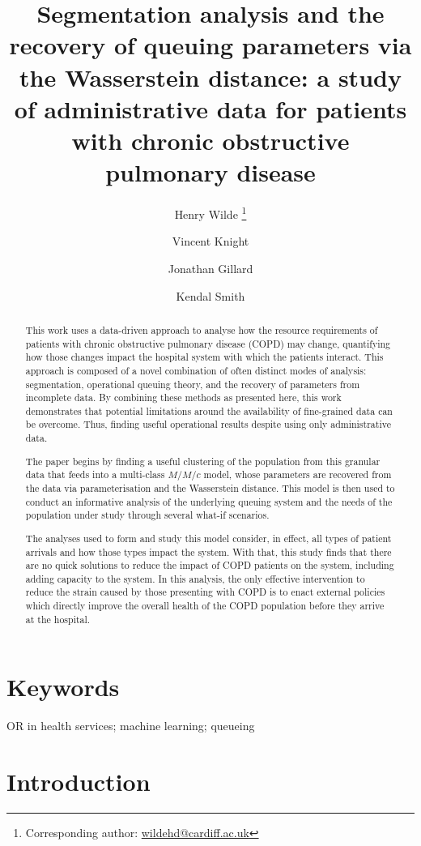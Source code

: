 \documentclass[11pt]{article}
\title{%
    Segmentation analysis and the recovery of queuing parameters via the
    Wasserstein distance: a study of administrative data for patients with
    chronic obstructive pulmonary disease
}
\author[a]{%
    Henry Wilde \footnote{Corresponding author: \url{wildehd@cardiff.ac.uk}}%
}
\author[a]{Vincent Knight}
\author[a]{Jonathan Gillard}
\author[b]{Kendal Smith}
\affil[a]{School of Mathematics, Cardiff University}
\affil[b]{Cwm Taf Morgannwg University Health Board}
\date{}
\begin{document}
\maketitle%

\begin{abstract}
    This work uses a data-driven approach to analyse how the resource
    requirements of patients with chronic obstructive pulmonary disease (COPD)
    may change, quantifying how those changes impact the hospital system with
    which the patients interact. This approach is composed of a novel
    combination of often distinct modes of analysis: segmentation, operational
    queuing theory, and the recovery of parameters from incomplete data. By
    combining these methods as presented here, this work demonstrates that
    potential limitations around the availability of fine-grained data can be
    overcome. Thus, finding useful operational results despite using only
    administrative data.

    The paper begins by finding a useful clustering of the population from this
    granular data that feeds into a multi-class \(M/M/c\) model, whose
    parameters are recovered from the data via parameterisation and the
    Wasserstein distance. This model is then used to conduct an informative
    analysis of the underlying queuing system and the needs of the population
    under study through several what-if scenarios.

    The analyses used to form and study this model consider, in effect, all
    types of patient arrivals and how those types impact the system. With that,
    this study finds that there are no quick solutions to reduce the impact of
    COPD patients on the system, including adding capacity to the system. In
    this analysis, the only effective intervention to reduce the strain caused
    by those presenting with COPD is to enact external policies which directly
    improve the overall health of the COPD population before they arrive at the
    hospital.
\end{abstract}

\section*{Keywords}

OR in health services; machine learning; queueing


\section{Introduction}\label{sec:intro}
\end{document}
